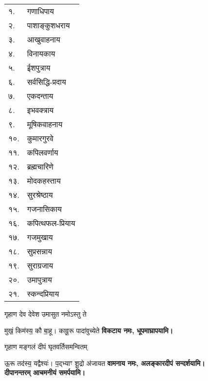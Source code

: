 \begin{center}
\begin{longtable}{ll@{~नमः — दूर्वायुग्मं समर्पयामि।}}
    १. & गणाधिपाय \\
    २. & पाशाङ्कुशधराय \\
    ३. & आखुवाहनाय \\
    ४. & विनायकाय \\
    ५. & ईशपुत्राय \\
    ६. & सर्वसिद्धि-प्रदाय \\
    ७. & एकदन्ताय \\
    ८. & इभवक्त्राय \\
    ९. & मूषिकवाहनाय \\
    १०. & कुमारगुरवे \\
    ११. & कपिलवर्णाय \\
    १२. & ब्रह्मचारिणे \\
    १३. & मोदकहस्ताय \\
    १४. & सुरश्रेष्ठाय \\
    १५. & गजनासिकाय \\
    १६. & कपित्थफल-प्रियाय \\
    १७. & गजमुखाय \\
    १८. & सुप्रसन्नाय \\
    १९. & सुराग्रजाय \\
    २०. & उमापुत्राय \\
    २१. & स्कन्दप्रियाय \\
\end{longtable}

\needspace{3em}
\begingroup
\setlength{\columnseprule}{1pt}
\let\chapt\sect


\endgroup

{गृहाण देव देवेश उमासुत नमोऽस्तु ते}

{मुखं॒ किम॑स्य॒ कौ बा॒हू। कावू॒रू पादा॑वुच्येते}
\textbf{विकटाय नमः, धूपमाघ्रापयामि।}
\medskip

{गृहाण मङ्गलं दीपं घृतवर्तिसमन्वितम्}

{ऊ॒रू तद॑स्य॒ यद्वैश्यः॑। प॒द्भ्याꣳ शू॒द्रो अ॑जायत}
\textbf{वामनाय नमः, अलङ्कारदीपं सन्दर्शयामि।\\
दीपानन्तरम् आचमनीयं समर्पयामि।}
\medskip


\end{center}
